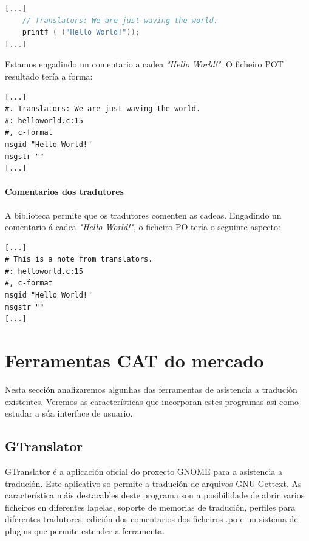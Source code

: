 \begin{lstlisting}[language=C,caption=Tradución con comentario.]
[...]
    // Translators: We are just waving the world.
    printf (_("Hello World!"));
[...]
\end{lstlisting}

Estamos engadindo un comentario a cadea \emph{"Hello World!"}. O ficheiro POT resultado tería a forma:

\begin{lstlisting}[label=some-code,caption=Ficheiro POT con comentario.]
[...]
#. Translators: We are just waving the world.
#: helloworld.c:15
#, c-format
msgid "Hello World!"
msgstr ""
[...]
\end{lstlisting}


\paragraph{Comentarios dos tradutores}
A biblioteca permite que os tradutores comenten as cadeas. Engadindo un comentario á cadea \emph{"Hello World!"}, o ficheiro PO tería o seguinte aspecto:

\begin{lstlisting}[caption=Ficheiro PO con comentario.]
[...]
# This is a note from translators.
#: helloworld.c:15
#, c-format
msgid "Hello World!"
msgstr ""
[...]
\end{lstlisting}

\section{Ferramentas CAT do mercado}

Nesta sección analizaremos algunhas das ferramentas de asistencia a tradución existentes. Veremos as características que incorporan estes programas así como estudar a súa interface de usuario.

\subsection{GTranslator}
GTranslator é a aplicación oficial do proxecto GNOME para a asistencia a tradución. Este aplicativo so permite a tradución de arquivos GNU Gettext. As característica máis destacables deste programa son a posibilidade de abrir varios ficheiros en diferentes lapelas, soporte de memorias de tradución, perfiles para diferentes tradutores, edición dos comentarios dos ficheiros .po e un sistema de plugins que permite estender a ferramenta.

